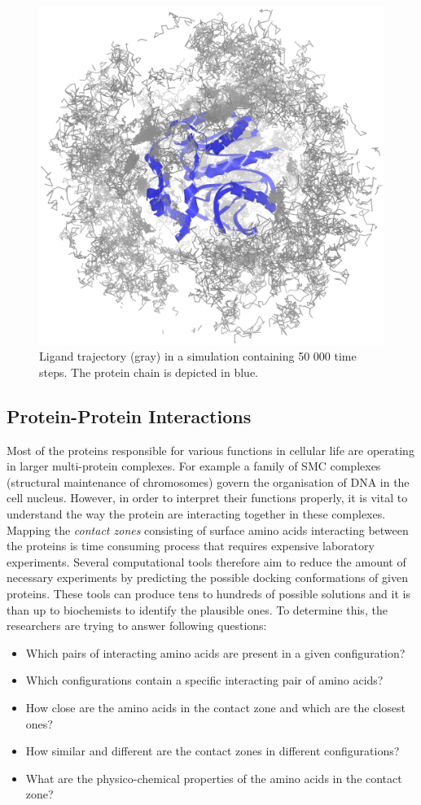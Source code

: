 \begin{figure}[H]
  \centering
  \includegraphics[width=0.5\linewidth]{pictures/lig_movement.png} 
  \caption{Ligand trajectory (gray) in a simulation containing 50 000 time steps. The protein chain is depicted in blue.}
  \label{Fig:trajectory}  
\end{figure} 

\subsection{Protein-Protein Interactions}
Most of the proteins responsible for various functions in cellular life are operating in larger multi-protein complexes. For example a family of SMC complexes (structural maintenance of chromosomes) govern the organisation of DNA in the cell nucleus. However, in order to interpret their functions properly, it is vital to understand the way the protein are interacting together in these complexes. Mapping the \textit{contact zones} consisting of surface amino acids interacting between the proteins is time consuming process that requires expensive laboratory experiments. Several computational tools therefore aim to reduce the amount of necessary experiments by predicting the possible docking conformations of given proteins. These tools can produce tens to hundreds of possible solutions and it is than up to biochemists to identify the plausible ones. To determine this, the researchers are trying to answer following questions:

\begin{itemize}
\setlength\itemsep{0.5pt}
\item{Which pairs of interacting amino acids are present in a given configuration?}
\item{Which configurations contain a specific interacting pair of
amino acids?}
\item{How close are the amino acids in the contact zone and which
are the closest ones?}
\item{How similar and different are the contact zones in different configurations?}
\item{What are the physico-chemical properties of the amino acids
in the contact zone?}
\end{itemize}

